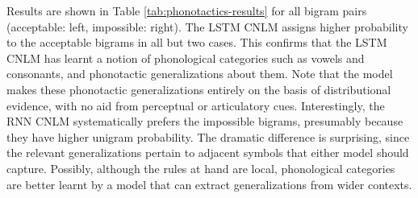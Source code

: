 Results are shown in Table \ref{tab:phonotactics-results} for all
bigram pairs (acceptable: left, impossible: right).  The LSTM CNLM
assigns higher probability to the acceptable bigrams in all but two
cases.  This confirms that the LSTM CNLM has learnt a notion of
phonological categories such as vowels and consonants, and phonotactic
generalizations about them.  Note that the model makes these
phonotactic generalizations entirely on the basis of distributional
evidence, with no aid from perceptual or articulatory
cues. Interestingly, the RNN CNLM systematically prefers the
impossible bigrams, presumably because they have higher unigram
probability. The dramatic difference is surprising, since the relevant
generalizations pertain to adjacent symbols that either model should
capture. Possibly, although the rules at hand are local, phonological
categories are better learnt by a model that can extract
generalizations from wider contexts.

